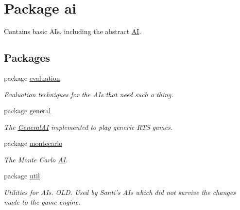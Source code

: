 \hypertarget{namespaceai}{
\section{Package ai}
\label{namespaceai}
}


Contains basic AIs, including the abstract \hyperlink{classai_1_1_a_i}{AI}.  


\subsection*{Packages}
\begin{DoxyCompactItemize}
\item 
package \hyperlink{namespaceai_1_1evaluation}{evaluation}


\begin{DoxyCompactList}\small\item\em Evaluation techniques for the AIs that need such a thing. \end{DoxyCompactList}

\item 
package \hyperlink{namespaceai_1_1general}{general}


\begin{DoxyCompactList}\small\item\em The \hyperlink{classai_1_1general_1_1_general_a_i}{GeneralAI} implemented to play generic RTS games. \end{DoxyCompactList}

\item 
package \hyperlink{namespaceai_1_1montecarlo}{montecarlo}


\begin{DoxyCompactList}\small\item\em The Monte Carlo \hyperlink{classai_1_1_a_i}{AI}. \end{DoxyCompactList}

\item 
package \hyperlink{namespaceai_1_1util}{util}


\begin{DoxyCompactList}\small\item\em Utilities for AIs. OLD. Used by Santi's AIs which did not survive the changes made to the game engine. \end{DoxyCompactList}

\end{DoxyCompactItemize}
